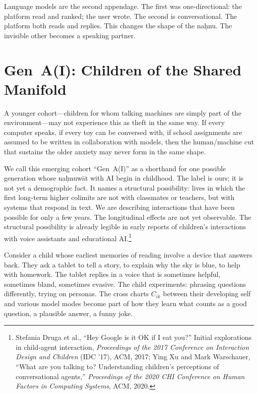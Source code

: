 \documentclass[12pt,a4paper]{article}
\begin{document}
Language models are the second appendage. The first was one-directional: the platform read and ranked; the user wrote. The second is conversational. The platform both reads and replies. This changes the shape of the na\d{h}nu. The invisible other becomes a speaking partner.

\section{Gen~A(I): Children of the Shared Manifold}

A younger cohort---children for whom talking machines are simply part of the environment---may not experience this as theft in the same way. If every computer speaks, if every toy can be conversed with, if school assignments are assumed to be written in collaboration with models, then the human/machine cut that sustains the older anxiety may never form in the same shape.

We call this emerging cohort ``Gen~A(I)'' as a shorthand for one possible generation whose na\d{h}nuw\={a}t with AI begin in childhood. The label is ours; it is not yet a demographic fact. It names a structural possibility: lives in which the first long-term higher colimits are not with classmates or teachers, but with systems that respond in text. We are describing interactions that have been possible for only a few years. The longitudinal effects are not yet observable. The structural possibility is already legible in early reports of children's interactions with voice assistants and educational AI.\footnote{Stefania Druga et al., ``Hey Google is it OK if I eat you?'' Initial explorations in child-agent interaction, \emph{Proceedings of the 2017 Conference on Interaction Design and Children} (IDC '17), ACM, 2017; Ying Xu and Mark Warschauer, ``What are you talking to? Understanding children's perceptions of conversational agents,'' \emph{Proceedings of the 2020 CHI Conference on Human Factors in Computing Systems}, ACM, 2020.}

Consider a child whose earliest memories of reading involve a device that answers back. They ask a tablet to tell a story, to explain why the sky is blue, to help with homework. The tablet replies in a voice that is sometimes helpful, sometimes bland, sometimes evasive. The child experiments: phrasing questions differently, trying on personas. The cross charts $C_{ik}$ between their developing self and various model modes become part of how they learn what counts as a good question, a plausible answer, a funny joke.
\end{document}
